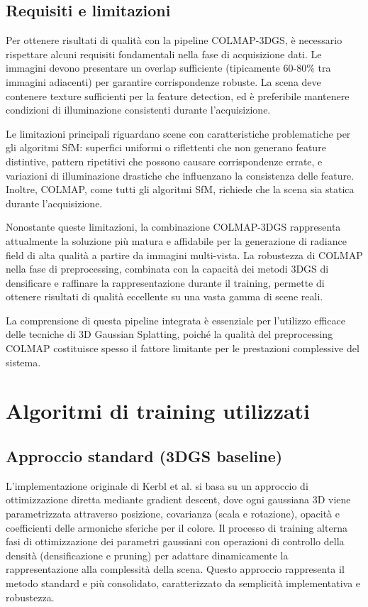 \subsection{Requisiti e limitazioni}

Per ottenere risultati di qualità con la pipeline COLMAP-3DGS, è necessario rispettare alcuni requisiti fondamentali nella fase di acquisizione dati. Le immagini devono presentare un overlap sufficiente (tipicamente 60-80\% tra immagini adiacenti) per garantire corrispondenze robuste. La scena deve contenere texture sufficienti per la feature detection, ed è preferibile mantenere condizioni di illuminazione consistenti durante l'acquisizione.

Le limitazioni principali riguardano scene con caratteristiche problematiche per gli algoritmi SfM: superfici uniformi o riflettenti che non generano feature distintive, pattern ripetitivi che possono causare corrispondenze errate, e variazioni di illuminazione drastiche che influenzano la consistenza delle feature. Inoltre, COLMAP, come tutti gli algoritmi SfM, richiede che la scena sia statica durante l'acquisizione.

Nonostante queste limitazioni, la combinazione COLMAP-3DGS rappresenta attualmente la soluzione più matura e affidabile per la generazione di radiance field di alta qualità a partire da immagini multi-vista. La robustezza di COLMAP nella fase di preprocessing, combinata con la capacità dei metodi 3DGS di densificare e raffinare la rappresentazione durante il training, permette di ottenere risultati di qualità eccellente su una vasta gamma di scene reali.

La comprensione di questa pipeline integrata è essenziale per l'utilizzo efficace delle tecniche di 3D Gaussian Splatting, poiché la qualità del preprocessing COLMAP costituisce spesso il fattore limitante per le prestazioni complessive del sistema.

\section{Algoritmi di training utilizzati}

\subsection{Approccio standard (3DGS baseline)}

L'implementazione originale di Kerbl et al. si basa su un approccio di ottimizzazione diretta mediante gradient descent, dove ogni gaussiana 3D viene parametrizzata attraverso posizione, covarianza (scala e rotazione), opacità e coefficienti delle armoniche sferiche per il colore. Il processo di training alterna fasi di ottimizzazione dei parametri gaussiani con operazioni di controllo della densità (densificazione e pruning) per adattare dinamicamente la rappresentazione alla complessità della scena. Questo approccio rappresenta il metodo standard e più consolidato, caratterizzato da semplicità implementativa e robustezza.

